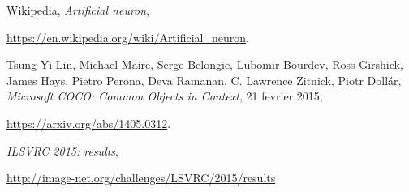 \begin{thebibliography}{9}

		Wikipedia,
		\emph{Artificial neuron},
		\par
		\url{https://en.wikipedia.org/wiki/Artificial_neuron}.

		Tsung-Yi Lin, Michael Maire, Serge Belongie, Lubomir Bourdev, Ross Girshick, James Hays, Pietro Perona, Deva Ramanan, C. Lawrence Zitnick, Piotr Dollár,
		\emph{Microsoft COCO: Common Objects in Context},
		21 fevrier 2015,
		\par
		\url{https://arxiv.org/abs/1405.0312}.

		\emph{ILSVRC 2015: results},
		\par
		\url{http://image-net.org/challenges/LSVRC/2015/results}

\end{thebibliography}
